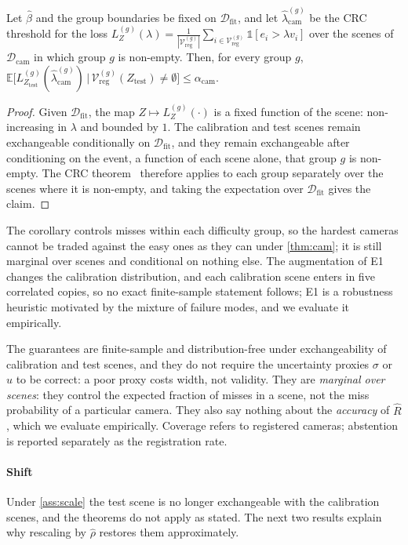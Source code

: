 \begin{corollary}\label{cor:group}
Let $\hat\beta$ and the group boundaries be fixed on $\mathcal{D}_{\mathrm{fit}}$, and let $\hat\lambda^{(g)}_{\mathrm{cam}}$ be the CRC threshold for the loss $L^{(g)}_Z(\lambda)=\frac{1}{|\mathcal{V}^{(g)}_{\mathrm{reg}}|}\sum_{i\in\mathcal{V}^{(g)}_{\mathrm{reg}}}\mathbb{1}[e_i>\lambda v_i]$ over the scenes of $\mathcal{D}_{\mathrm{cam}}$ in which group $g$ is non-empty. Then, for every group $g$, $\mathbb{E}\big[L^{(g)}_{Z_{\mathrm{test}}}(\hat\lambda^{(g)}_{\mathrm{cam}})\,\big|\,\mathcal{V}^{(g)}_{\mathrm{reg}}(Z_{\mathrm{test}})\neq\emptyset\big]\le\alpha_{\mathrm{cam}}$.
\end{corollary}
\begin{proof}
Given $\mathcal{D}_{\mathrm{fit}}$, the map $Z\mapsto L^{(g)}_Z(\cdot)$ is a fixed function of the scene: non-increasing in $\lambda$ and bounded by $1$. The calibration and test scenes remain exchangeable conditionally on $\mathcal{D}_{\mathrm{fit}}$, and they remain exchangeable after conditioning on the event, a function of each scene alone, that group $g$ is non-empty. The CRC theorem~\cite{angelopoulos2024crc} therefore applies to each group separately over the scenes where it is non-empty, and taking the expectation over $\mathcal{D}_{\mathrm{fit}}$ gives the claim.
\end{proof}
The corollary controls misses within each difficulty group, so the hardest cameras cannot be traded against the easy ones as they can under \cref{thm:cam}; it is still marginal over scenes and conditional on nothing else. The augmentation of E1 changes the calibration distribution, and each calibration scene enters in five correlated copies, so no exact finite-sample statement follows; E1 is a robustness heuristic motivated by the mixture of failure modes, and we evaluate it empirically.

The guarantees are finite-sample and distribution-free under exchangeability of calibration and test scenes, and they do not require the uncertainty proxies $\sigma$ or $u$ to be correct: a poor proxy costs width, not validity. They are \emph{marginal over scenes}: they control the expected fraction of misses in a scene, not the miss probability of a particular camera. They also say nothing about the \emph{accuracy} of $\hat R$, which we evaluate empirically. Coverage refers to registered cameras; abstention is reported separately as the registration rate.

\paragraph*{Shift} Under \cref{ass:scale} the test scene is no longer exchangeable with the calibration scenes, and the theorems do not apply as stated. The next two results explain why rescaling by $\hat\rho$ restores them approximately.

